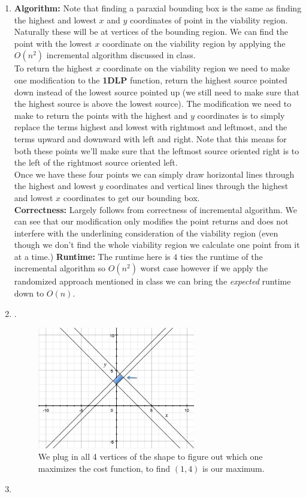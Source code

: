 \documentclass[11pt]{article}
\begin{document}
\begin{enumerate}
	\item
		\textbf{Algorithm:}
		Note that finding a paraxial bounding box is the same as finding
		the highest and lowest $x$ and $y$ coordinates of point in the viability
		region. Naturally these will be at vertices of the bounding
		region. We can find the point with the lowest $x$ coordinate on the
		viability region by applying the $O(n^2)$ incremental algorithm
		discussed in class. \\
		To return the highest $x$ coordinate on the viability region we
		need to make one modification to the \textbf{1DLP} function,
		return the highest source pointed down instead  of the lowest
		source pointed up (we still
		need to make sure that the highest source is above the lowest
		source). The modification we need to make to return the points with
		the highest and $y$ coordinates is to simply replace the terms
		highest and lowest with rightmost and leftmost, and the terms
		upward and downward with left and right. Note that  this means for both
		these points we'll make sure that the leftmost source oriented
		right is to the left of the rightmost source oriented left.\\
		Once we have these four points we can simply draw horizontal
		lines through the highest and lowest $y$ coordinates and
		vertical lines through the highest and lowest $x$ coordinates
		to get our bounding box.\\
		\textbf{Correctness:}
		Largely follows from correctness of incremental algorithm. We
		can see that our modification only modifies the point returns
		and does not interfere with the underlining consideration of the
		viability region (even though we don't find the whole viability
		region we calculate one point from it at a time.)
		\textbf{Runtime:}
		The runtime here is $4$ ties the runtime of the incremental
		algorithm so $O(n^2)$ worst case however if we apply the
		randomized approach mentioned in class we can bring the
		\textit{expected} runtime down to $O(n)$.
	\item .
		\begin{figure}[h]
		  \centering
		      \includegraphics[width=0.65\textwidth]{fig2}
		  \caption{
		We plug in all 4 vertices of the shape to figure out which one
		maximizes the cost function, to find
			$(1,4)$ is our maximum.
		}
		\end{figure}
	\item 


\end{enumerate}
\end{document}
